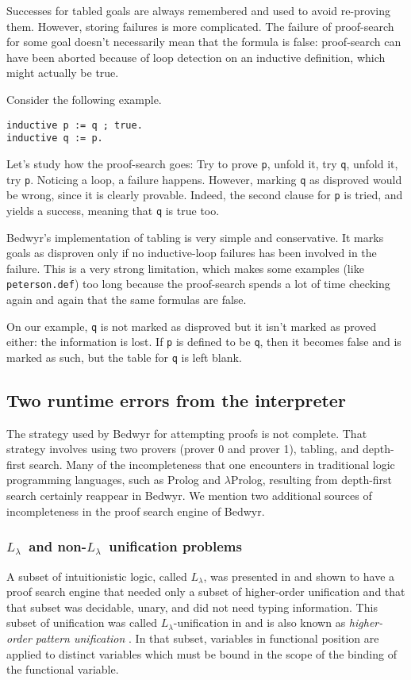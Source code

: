 \documentclass{article}
\newcommand{\lp}{$\lambda$Prolog}
\newcommand{\Ll}{$L_\lambda$}
\begin{document}
Successes for tabled goals are always remembered and used to avoid
re-proving them. However, storing failures is more complicated.
The failure of proof-search for some goal doesn't necessarily mean
that the formula is false: proof-search can have been aborted because
of loop detection on an inductive definition, which might actually be true.

Consider the following example.
\begin{verbatim}
inductive p := q ; true.
inductive q := p.
\end{verbatim}

Let's study how the proof-search goes:
Try to prove \verb.p., unfold it, try \verb.q., unfold it, try \verb.p..
Noticing a loop, a failure happens.
However, marking \verb.q. as disproved would be wrong,
since it is clearly provable.
Indeed, the second clause for \verb.p. is tried, and yields a
success, meaning that \verb.q. is true too.

Bedwyr's implementation of tabling is very simple and conservative.
It marks goals as
disproven only if no inductive-loop failures has been involved in the failure.
This is a very strong limitation, which makes some examples (like
\verb+peterson.def+) too long because the proof-search spends a lot of time
checking again and again that the same formulas are false.

On our example, \verb.q. is not marked as disproved
but it isn't marked as proved either: the information is lost.
If \verb.p. is defined to be \verb.q.,
then it becomes false and is marked as such,
but the table for \verb.q. is left blank.

\subsection{Two runtime errors from the interpreter}

The strategy used by Bedwyr for attempting proofs is not complete.
That strategy involves using two provers (prover 0 and prover 1),
tabling, and depth-first search.
Many of the incompleteness that one encounters in
traditional logic programming languages, such as Prolog and \lp,
resulting from depth-first search certainly reappear in Bedwyr.  We
mention two additional sources of incompleteness in the proof search
engine of Bedwyr.

\subsubsection{\Ll\ and non-\Ll\ unification problems}
A subset of intuitionistic logic, called \Ll, was presented in
\cite{miller91jlc} and shown to have a proof search engine that needed
only a subset of higher-order unification and that that subset was
decidable, unary, and did not need typing information.  This subset
of unification was called \Ll-unification in \cite{miller91jlc} and
is also known as {\em higher-order pattern unification}
\cite{nipkow93lics,nadathur05iclp}.  In that subset, variables in
functional position are applied to distinct variables which must be
bound in the scope of the binding of the functional variable.
\end{document}
